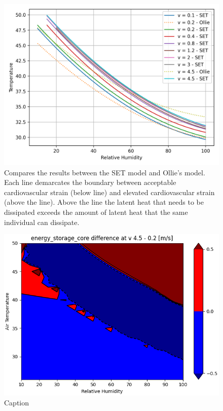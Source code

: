 \begin{figure}
    \centering
    \includegraphics[width=\textwidth]{figures/comparison_air_speed.png}
    \caption{Compares the results between the SET model and Ollie's model.
    Each line demarcates the boundary between acceptable cardiovascular strain (below line) and elevated cardiovascular strain (above the line).
    Above the line the latent heat that needs to be dissipated exceeds the amount of latent heat that the same individual can dissipate. }
    \label{fig:comparison_air_speed}
\end{figure}

\begin{figure}
    \centering
    \includegraphics[width=\textwidth]{figures/energy_storage_delta.png}
    \caption{Caption}
    \label{fig:energy_storage_delta}
\end{figure}

